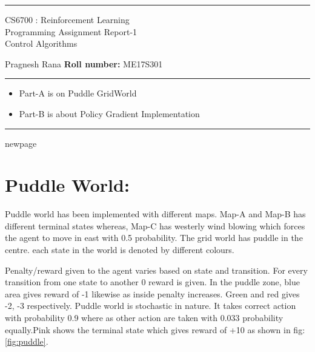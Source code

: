 \documentclass[preprint,12pt]{elsarticle}
\begin{document}
\hrule
\vspace{1mm}
\noindent 
\begin{center}
{\Large CS6700 : Reinforcement Learning} \\

{\large Programming Assignment Report-1} \\
{\large Control Algorithms   \hfill }
\end{center}
\vspace{1mm}
\noindent 



 Pragnesh Rana \hfill {\bf Roll number:} ME17S301
\vspace{2mm}
\hrule

{\small

\begin{itemize}\itemsep0mm
\item Part-A is on Puddle GridWorld
\item Part-B is about Policy Gradient Implementation 
\end{itemize}
}
\hrule
\vspace{3mm}
newpage




\section{Puddle World:}

 Puddle world has been implemented with different maps. Map-A and Map-B has different terminal states whereas, Map-C has westerly wind blowing which forces the agent to move in east with 0.5 probability. The grid world has puddle in the centre. each state in the world is denoted by different colours. 

Penalty/reward given to the agent varies based on state and transition.  For every transition from one state to another 0 reward is given. In the puddle zone, blue area gives reward of -1 likewise as inside penalty increases. Green and red gives -2, -3 respectively. Puddle world is stochastic in nature. It takes correct action with probability 0.9 where as other action are taken with 0.033 probability equally.Pink shows the terminal state which gives reward of +10 as shown in fig:\ref{fig:puddle}.
\end{document}

